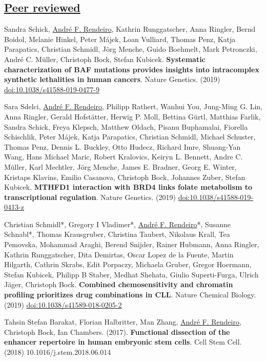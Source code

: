 \documentclass[11pt,a4paper,roman]{moderncv} %
\begin{document}
    \subsection{\underline{Peer reviewed}}
        \begin{etaremune}[leftmargin=2.5cm,itemindent=0pt,topsep=10pt,itemsep=2pt,partopsep=0pt,parsep=0pt]
        \item Sandra Schick, \underline{André F. Rendeiro}, Kathrin Runggatscher, Anna Ringler, Bernd Boidol, Melanie Hinkel, Peter Májek, Loan Vulliard, Thomas Penz, Katja Parapatics, Christian Schmidl, Jörg Menche, Guido Boehmelt, Mark Petronczki, André C. Müller, Christoph Bock, Stefan Kubicek. \textbf{Systematic characterization of BAF mutations provides insights into intracomplex synthetic lethalities in human cancers}. Nature Genetics. (2019) \href{https://dx.doi.org/10.1038/s41588-019-0477-9}{doi:10.1038/s41588-019-0477-9}
        \item Sara Sdelci, \underline{André F. Rendeiro}, Philipp Rathert, Wanhui You, Jung-Ming G. Lin, Anna Ringler, Gerald Hofstätter, Herwig P. Moll, Bettina Gürtl, Matthias Farlik, Sandra Schick, Freya Klepsch, Matthew Oldach, Pisanu Buphamalai, Fiorella Schischlik, Peter Májek, Katja Parapatics, Christian Schmidl, Michael Schuster, Thomas Penz, Dennis L. Buckley, Otto Hudecz, Richard Imre, Shuang-Yan Wang, Hans Michael Maric, Robert Kralovics, Keiryn L. Bennett, Andre C. Müller, Karl Mechtler, Jörg Menche, James E. Bradner, Georg E. Winter, Kristaps Klavins, Emilio Casanova, Christoph Bock, Johannes Zuber, Stefan Kubicek. \textbf{MTHFD1 interaction with BRD4 links folate metabolism to transcriptional regulation}. Nature Genetics. (2019) \href{https://dx.doi.org/10.1038/s41588-019-0413-z}{doi:10.1038/s41588-019-0413-z}
        \item Christian Schmidl*, Gregory I Vladimer*, \underline{André F. Rendeiro}*, Susanne Schnabl*, Thomas Krausgruber, Christina Taubert, Nikolaus Krall, Tea Pemovska, Mohammad Araghi, Berend Snijder, Rainer Hubmann, Anna Ringler, Kathrin Runggatscher, Dita Demirtas, Oscar Lopez de la Fuente, Martin Hilgarth, Cathrin Skrabs, Edit Porpaczy, Michaela Gruber, Gregor Hoermann, Stefan Kubicek, Philipp B Staber, Medhat Shehata, Giulio Superti-Furga, Ulrich Jäger, Christoph Bock. \textbf{Combined chemosensitivity and chromatin profiling prioritizes drug combinations in CLL}. Nature Chemical Biology. (2019) \href{https://dx.doi.org/10.1038/s41589-018-0205-2}{doi:10.1038/s41589-018-0205-2}
        \item Tahsin Stefan Barakat, Florian Halbritter, Man Zhang, \underline{André F. Rendeiro}, Christoph Bock, Ian Chambers. (2017). \textbf{Functional dissection of the enhancer repertoire in human embryonic stem cells}. Cell Stem Cell. (2018) 10.1016/j.stem.2018.06.014

\end{etaremune}
\end{document}
